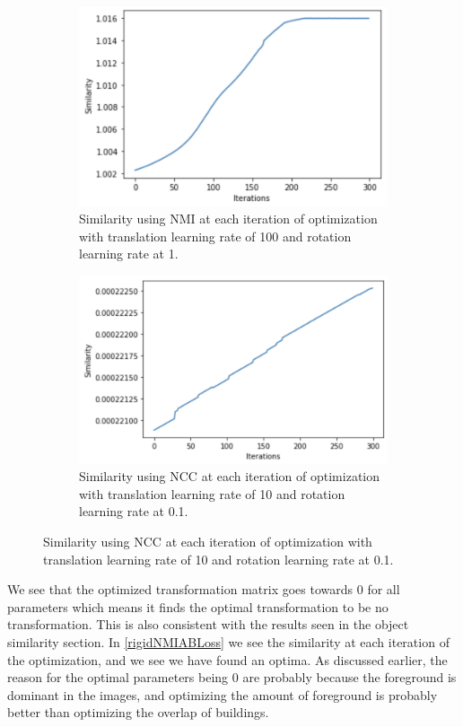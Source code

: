 \begin{figure}
	\centering
	\begin{subfigure}{0.4\linewidth}
		\centering
		\includegraphics[width=\linewidth]{Materials/RigidNMILoss}
		\caption{Similarity using NMI at each iteration of optimization with translation learning rate of 100 and rotation learning rate at 1.}
		\label{rigidNMIABLoss}
	\end{subfigure}
	\hspace{1cm}
	\begin{subfigure}{0.4\linewidth}
		\centering
		\includegraphics[width=\linewidth]{Materials/RigidNCCLoss}
		\caption{Similarity using NCC at each iteration of optimization with translation learning rate of 10 and rotation learning rate at 0.1.}
		\label{rigidNCCABLoss}
	\end{subfigure}

\end{figure}
We see that the optimized transformation matrix goes towards 0 for all parameters which means it finds the optimal transformation to be no transformation. This is also consistent with the results seen in the object similarity section. In \autoref{rigidNMIABLoss} we see the similarity at each iteration of the optimization, and we see we have found an optima. As discussed earlier, the reason for the optimal parameters being 0 are probably because the foreground is dominant in the images, and optimizing the amount of foreground is probably better than optimizing the overlap of buildings.\\

